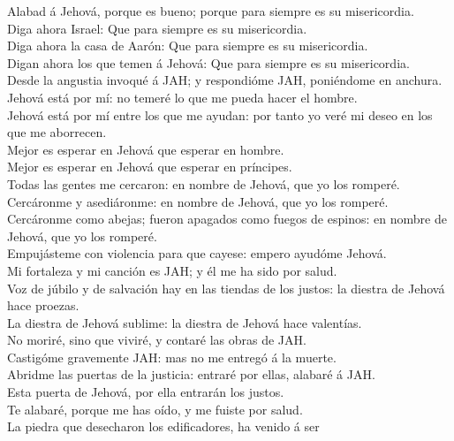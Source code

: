  Alabad á Jehová, porque es bueno; porque para siempre es su
misericordia.\\
 Diga ahora Israel: Que para siempre es su misericordia.\\
 Diga ahora la casa de Aarón: Que para siempre es su
misericordia.\\
 Digan ahora los que temen á Jehová: Que para siempre es su
misericordia.\\
 Desde la angustia invoqué á JAH; y respondióme JAH,
poniéndome en anchura.\\
 Jehová está por mí: no temeré lo que me pueda hacer el
hombre.\\
 Jehová está por mí entre los que me ayudan: por tanto yo
veré mi deseo en los que me aborrecen.\\
 Mejor es esperar en Jehová que esperar en hombre.\\
 Mejor es esperar en Jehová que esperar en príncipes.\\
 Todas las gentes me cercaron: en nombre de Jehová, que yo
los romperé.\\
 Cercáronme y asediáronme: en nombre de Jehová, que yo los
romperé.\\
 Cercáronme como abejas; fueron apagados como fuegos de
espinos: en nombre de Jehová, que yo los romperé.\\
 Empujásteme con violencia para que cayese: empero ayudóme
Jehová.\\
 Mi fortaleza y mi canción es JAH; y él me ha sido por
salud.\\
 Voz de júbilo y de salvación hay en las tiendas de los
justos: la diestra de Jehová hace proezas.\\
 La diestra de Jehová sublime: la diestra de Jehová hace
valentías.\\
 No moriré, sino que viviré, y contaré las obras de JAH.\\
 Castigóme gravemente JAH: mas no me entregó á la muerte.\\
 Abridme las puertas de la justicia: entraré por ellas,
alabaré á JAH.\\
 Esta puerta de Jehová, por ella entrarán los justos.\\
 Te alabaré, porque me has oído, y me fuiste por salud.\\
 La piedra que desecharon los edificadores, ha venido á ser
